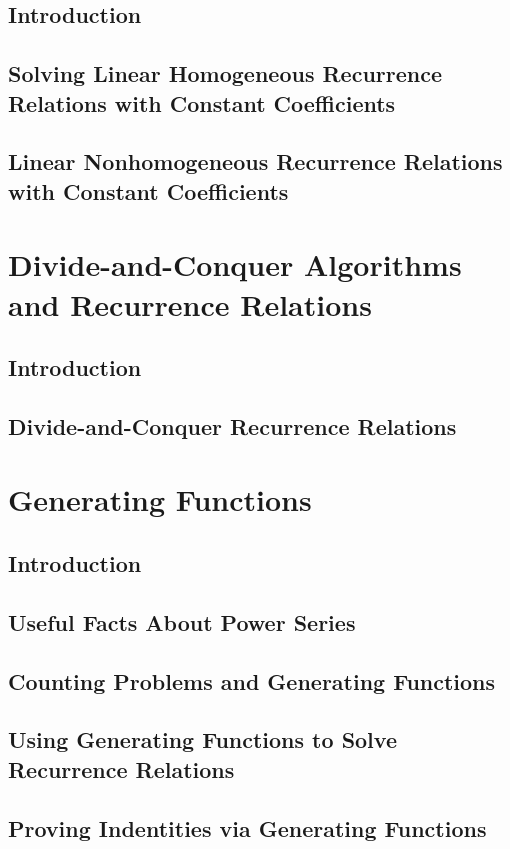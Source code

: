 \documentclass[11pt]{book}
\begin{document}
  \subsection{Introduction}
  \subsection{Solving Linear Homogeneous Recurrence Relations with Constant Coefficients}
  \subsection{Linear Nonhomogeneous Recurrence Relations with Constant Coefficients}
  
 \section{Divide-and-Conquer Algorithms and Recurrence Relations}
  \subsection{Introduction}
  \subsection{Divide-and-Conquer Recurrence Relations}
  
 \section{Generating Functions}
  \subsection{Introduction}
  \subsection{Useful Facts About Power Series}
  \subsection{Counting Problems and Generating Functions}
  \subsection{Using Generating Functions to Solve Recurrence Relations}
  \subsection{Proving Indentities via Generating Functions}
  
\end{document}
